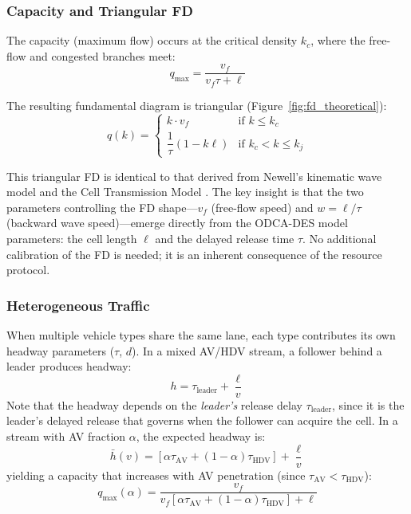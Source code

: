 \documentclass[review,authoryear]{elsarticle}
\begin{document}
\subsubsection{Capacity and Triangular FD}

The capacity (maximum flow) occurs at the critical density $k_c$, where the free-flow and congested branches meet:
\begin{equation}
    q_{\max} = \frac{v_f}{v_f \tau + \ell}
    \label{eq:capacity}
\end{equation}

The resulting fundamental diagram is triangular (Figure~\ref{fig:fd_theoretical}):
\begin{equation}
    q(k) = \begin{cases}
        k \cdot v_f & \text{if } k \leq k_c \\[4pt]
        \dfrac{1}{\tau}(1 - k\ell) & \text{if } k_c < k \leq k_j
    \end{cases}
    \label{eq:triangular_fd}
\end{equation}

This triangular FD is identical to that derived from Newell's kinematic wave model \citep{newell1993simplified} and the Cell Transmission Model \citep{daganzo1994cell}. The key insight is that the two parameters controlling the FD shape---$v_f$ (free-flow speed) and $w = \ell/\tau$ (backward wave speed)---emerge directly from the ODCA-DES model parameters: the cell length $\ell$ and the delayed release time $\tau$. No additional calibration of the FD is needed; it is an inherent consequence of the resource protocol.

\subsubsection{Heterogeneous Traffic}

When multiple vehicle types share the same lane, each type contributes its own headway parameters ($\tau$, $d$). In a mixed AV/HDV stream, a follower behind a leader produces headway:
\begin{equation}
    h = \tau_{\text{leader}} + \frac{\ell}{v}
    \label{eq:mixed_headway}
\end{equation}
Note that the headway depends on the \emph{leader's} release delay $\tau_{\text{leader}}$, since it is the leader's delayed release that governs when the follower can acquire the cell. In a stream with AV fraction $\alpha$, the expected headway is:
\begin{equation}
    \bar{h}(v) = \left[\alpha \tau_{\text{AV}} + (1-\alpha)\tau_{\text{HDV}}\right] + \frac{\ell}{v}
    \label{eq:mixed_avg_headway}
\end{equation}
yielding a capacity that increases with AV penetration (since $\tau_{\text{AV}} < \tau_{\text{HDV}}$):
\begin{equation}
    q_{\max}(\alpha) = \frac{v_f}{v_f\left[\alpha \tau_{\text{AV}} + (1-\alpha)\tau_{\text{HDV}}\right] + \ell}
    \label{eq:mixed_capacity}
\end{equation}
\end{document}
